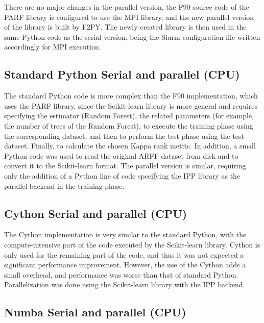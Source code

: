 There are no major changes in the parallel version, the F90 source code of the PARF library is configured to use the MPI library, and the new parallel version of the library is built by F2PY. The newly created library is then used in the same Python code as the serial version, being the Slurm configuration file written accordingly for MPI execution.

%
%
%
\subsection{Standard Python Serial and parallel (CPU)}
\label{sec_ffpyth}

The standard Python code is more complex than the F90 implementation, which uses the PARF library, since the Scikit-learn library is more general and requires specifying the estimator (Random Forest), the related parameters (for example, the number of trees of the Random Forest), to execute the training phase using the corresponding dataset, and then to perform the test phase using the test dataset. Finally, to calculate the chosen Kappa rank metric. In addition, a small Python code was used to read the original ARFF dataset from disk and to convert it to the Scikit-learn format. The parallel version is similar, requiring only the addition of a Python line of code specifying the IPP library as the parallel backend in the training phase. 

%
%
%
\subsection{Cython Serial and parallel (CPU)}
\label{sec_rfcyth}

The Cython implementation is very similar to the standard Python, with the compute-intensive part of the code executed by the Scikit-learn library. Cython is only used for the remaining part of the code, and thus it was not expected a significant performance improvement. However, the use of the Cython adds a small overhead, and performance was worse than that of standard Python. Parallelization was done using the Scikit-learn library with the IPP backend.

%
%
%
\subsection{Numba Serial and parallel (CPU)}
\label{sec_rfnumb}

